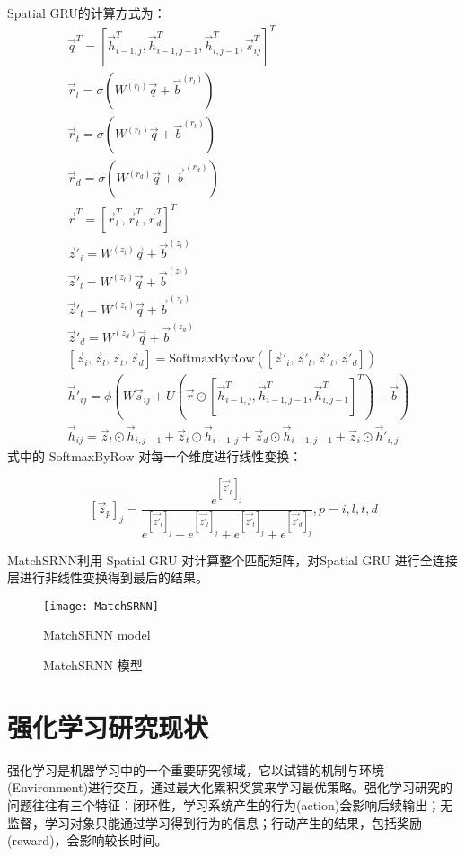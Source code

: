 Spatial GRU的计算方式为：
$$
\begin{aligned}
&\vec{q}^T = [\vec{h}^T_{i-1,j}, \vec{h}^T_{i-1,j-1}, \vec{h}^T_{i,j-1}, \vec{s}_{ij}^T]^T \\
&\vec{r}_l = \sigma(W^{(r_l)}\vec{q} + \vec{b}^{(r_l)})\\
&\vec{r}_t = \sigma(W^{(r_t)}\vec{q} + \vec{b}^{(r_t)})\\
&\vec{r}_d = \sigma(W^{(r_d)}\vec{q} + \vec{b}^{(r_d)})\\
&\vec{r}^T = [\vec{r}_l^T, \vec{r}_t^T, \vec{r}_d^T]^T\\
&\vec{z}'_i = W^{(z_i)}\vec{q} + \vec{b}^{(z_i)} \\
&\vec{z}'_l = W^{(z_l)}\vec{q} + \vec{b}^{(z_l)} \\
&\vec{z}'_t = W^{(z_t)}\vec{q} + \vec{b}^{(z_t)} \\
&\vec{z}'_d = W^{(z_d)}\vec{q} + \vec{b}^{(z_d)} \\
&[\vec{z}_i,\vec{z}_l,\vec{z}_t,\vec{z}_d] = \text{SoftmaxByRow}([\vec{z}'_i,\vec{z}'_l,\vec{z}'_t,\vec{z}'_d])\\
&\vec{h}'_{ij} = \phi(W\vec{s}_{ij} + U(\vec{r}\odot[\vec{h}^T_{i-1,j}, \vec{h}^T_{i-1,j-1}, \vec{h}^T_{i,j-1}]^T) + \vec{b})\\
&\vec{h}_{ij} = \vec{z}_l\odot\vec{h}_{i,j-1} + \vec{z}_t\odot\vec{h}_{i-1,j} + \vec{z}_d\odot\vec{h}_{i-1,j-1} + \vec{z}_i\odot\vec{h}'_{i,j}
\end{aligned}
$$
式中的 SoftmaxByRow 对每一个维度进行线性变换：

$$
[\vec{z}_p]_j = \frac{e^{[\vec{z'}_p]_j}}{e^{[\vec{z'}_i]_j}+e^{[\vec{z'}_l]_j}+e^{[\vec{z'}_t]_j}+e^{[\vec{z'}_d]_j}}, p=i,l,t,d
$$

MatchSRNN利用 Spatial GRU 对计算整个匹配矩阵，对Spatial GRU 进行全连接层进行非线性变换得到最后的结果。

\begin{figure}[!htbp]\centering
  \texttt{[image: MatchSRNN]}
  \caption{MatchSRNN 模型}{MatchSRNN model}
  \label{fig:MatchSRNN}       %
\end{figure}

\section{强化学习研究现状}
\label{sec:rl_intro}
强化学习\cite{Sutton1998ReinforcementL}是机器学习中的一个重要研究领域，它以试错的机制与环境(Environment)进行交互，通过最大化累积奖赏来学习最优策略。强化学习研究的问题往往有三个特征：闭环性，学习系统产生的行为(action)会影响后续输出；无监督，学习对象只能通过学习得到行为的信息；行动产生的结果，包括奖励(reward)，会影响较长时间。

